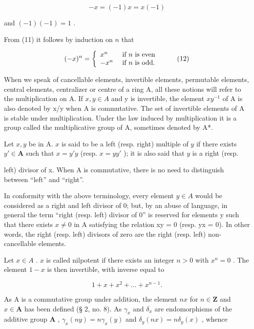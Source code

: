 \[
- x = (- 1) x = x (- 1)
\]

and \((-1)(-1) = 1\) .

From (11) it follows by induction on \(n\) that

\[
(- x) ^ {n} = \left\{ \begin{array}{l l} x ^ {n} & \text { if   } n \text {   is   even } \\ - x ^ {n} & \text { if   } n \text {   is   odd. } \end{array} \right.\tag{12}
\]

When we speak of cancellable elements, invertible elements, permutable elements, central elements, centralizer or centre of a ring A, all these notions will refer to the multiplication on A. If \(x, y \in A\) and y is invertible, the element \(xy^{-1}\) of A is also denoted by x/y when A is commutative. The set of invertible elements of A is stable under multiplication. Under the law induced by multiplication it is a group called the multiplicative group of A, sometimes denoted by A*.

Let \(x, y\) be in A. \(x\) is said to be a left (resp. right) multiple of \(y\) if there exists \(y' \in \mathbf{A}\) such that \(x = y'y\) (resp. \(x = yy'\) ); it is also said that \(y\) is a right (resp.

left) divisor of x. When A is commutative, there is no need to distinguish between ``left'' and ``right''.

In conformity with the above terminology, every element \(y \in A\) would be considered as a right and left divisor of 0; but, by an abuse of language, in general the term ``right (resp. left) divisor of 0'' is reserved for elements y such that there exists \(x \neq 0\) in A satisfying the relation xy = 0 (resp. yx = 0). In other words, the right (resp. left) divisors of zero are the right (resp. left) non-cancellable elements.

Let \(x \in A\) . \(x\) is called nilpotent if there exists an integer \(n > 0\) with \(x^n = 0\) . The element \(1 - x\) is then invertible, with inverse equal to

\[
1 + x + x ^ {2} + \dots + x ^ {n - 1}.
\]

As A is a commutative group under addition, the element \(nx\) for \(n \in \mathbf{Z}\) and \(x \in \mathbf{A}\) has been defined (§ 2, no. 8). As \(\gamma_x\) and \(\delta_x\) are endomorphisms of the additive group \(\mathbf{A}\) , \(\gamma_x(ny) = n\gamma_x(y)\) and \(\delta_y(nx) = n\delta_y(x)\) , whence

